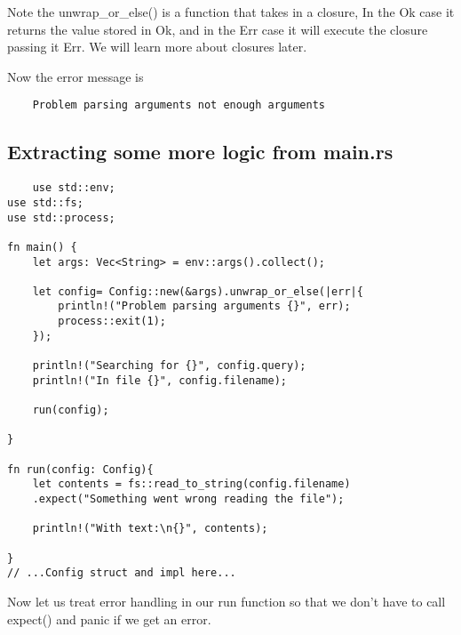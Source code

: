 Note the unwrap\_or\_else() is a function that takes in a closure, In the Ok case it returns the value stored in Ok, and in the Err case it will execute the closure passing it Err.
We will learn more about closures later.

Now the error message is \begin{lstlisting}
    Problem parsing arguments not enough arguments
\end{lstlisting}

\subsection{Extracting some more logic from main.rs}\begin{lstlisting}
    use std::env;
use std::fs;
use std::process;

fn main() {
    let args: Vec<String> = env::args().collect(); 
    
    let config= Config::new(&args).unwrap_or_else(|err|{
        println!("Problem parsing arguments {}", err);
        process::exit(1);
    });

    println!("Searching for {}", config.query);
    println!("In file {}", config.filename);

    run(config);

}

fn run(config: Config){
    let contents = fs::read_to_string(config.filename)
    .expect("Something went wrong reading the file");

    println!("With text:\n{}", contents);

}
// ...Config struct and impl here...
\end{lstlisting}

Now let us treat error handling in our run function so that we don't have to call {expect}() and panic if we get an error.
